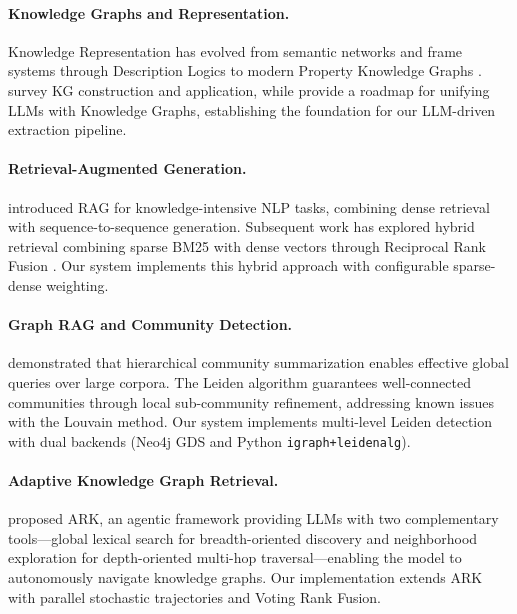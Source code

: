 \documentclass[11pt]{article}
\begin{document}
\paragraph{Knowledge Graphs and Representation.}
Knowledge Representation has evolved from semantic networks \citep{quillian1968semantic} and frame systems \citep{minsky1974frame} through Description Logics \citep{baader2003description} to modern Property Knowledge Graphs \citep{robinson2015graph}. \citet{ji2022survey} survey KG construction and application, while \citet{pan2024unifying} provide a roadmap for unifying LLMs with Knowledge Graphs, establishing the foundation for our LLM-driven extraction pipeline.

\paragraph{Retrieval-Augmented Generation.}
\citet{lewis2020rag} introduced RAG for knowledge-intensive NLP tasks, combining dense retrieval with sequence-to-sequence generation. Subsequent work has explored hybrid retrieval combining sparse BM25 \citep{robertson2009bm25} with dense vectors through Reciprocal Rank Fusion \citep{cormack2009rrf}. Our system implements this hybrid approach with configurable sparse-dense weighting.

\paragraph{Graph RAG and Community Detection.}
\citet{edge2024graphrag} demonstrated that hierarchical community summarization enables effective global queries over large corpora. The Leiden algorithm \citep{traag2019leiden} guarantees well-connected communities through local sub-community refinement, addressing known issues with the Louvain method. Our system implements multi-level Leiden detection with dual backends (Neo4j GDS and Python \texttt{igraph+leidenalg}).

\paragraph{Adaptive Knowledge Graph Retrieval.}
\citet{polonuer2026ark} proposed ARK, an agentic framework providing LLMs with two complementary tools---global lexical search for breadth-oriented discovery and neighborhood exploration for depth-oriented multi-hop traversal---enabling the model to autonomously navigate knowledge graphs. Our implementation extends ARK with parallel stochastic trajectories and Voting Rank Fusion.
\end{document}
